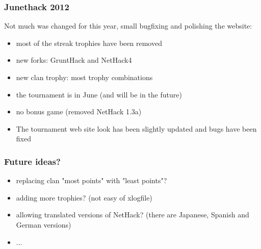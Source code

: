 \documentclass[handout]{beamer}
\begin{document}
\begin{frame}
\frametitle{Junethack 2012}
  Not much was changed for this year, small bugfixing and polishing the website:\pause
  \begin{itemize}[<+->]
    \item most of the streak trophies have been removed
    \item new forks: GruntHack and NetHack4
    \item new clan trophy: most trophy combinations
    \item the tournament is in June (and will be in the future)
    \item no bonus game (removed NetHack 1.3a)
    \item The tournament web site look has been slightly updated and bugs have been fixed
  \end{itemize}
\end{frame}

\begin{frame}
\frametitle{Future ideas?}
  \begin{itemize}[<+->]
    \item replacing clan "most points" with "least points"?
    \item adding more trophies? (not easy of xlogfile)
    \item allowing translated versions of NetHack? (there are Japanese, Spanish and
German versions)
    \item ...
  \end{itemize}
\end{frame}
\end{document}
